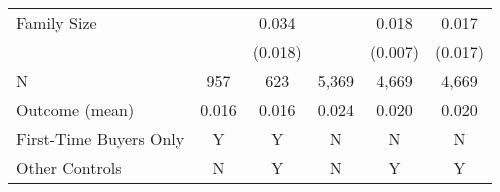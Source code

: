 {\begin{tabular}{l*{5}{c}}
\;Family Size   &                  &    0.034\sym{+}  &                  &    0.018\sym{*}  &    0.017         \\
                &                  &  (0.018)         &                  &  (0.007)         &  (0.017)         \\
\midrule
N               &      957         &      623         &    5,369         &    4,669         &    4,669         \\
Outcome (mean)  &    0.016         &    0.016         &    0.024         &    0.020         &    0.020         \\
First-Time Buyers Only&        Y         &        Y         &        N         &        N         &        N         \\
Other Controls  &        N         &        Y         &        N         &        Y         &        Y         \\
\bottomrule
\end{tabular}
}
